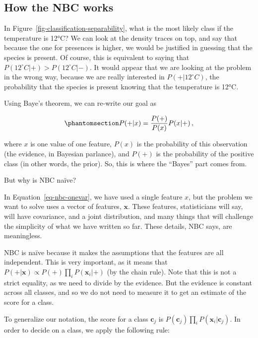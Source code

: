 \documentclass[
  letterpaper,
]{scrbook}
\begin{document}
\subsection{How the NBC works}\label{how-the-nbc-works}

In Figure~\ref{fig-classification-separability}, what is the most likely
class if the temperature is 12°C? We can look at the density traces on
top, and say that because the one for presences is higher, we would be
justified in guessing that the species is present. Of course, this is
equivalent to saying that \(P(12^\circ C | +) > P(12^\circ C | -)\). It
would appear that we are looking at the problem in the wrong way,
because we are really interested in \(P(+ | 12^\circ C)\), the
probability that the species is present knowing that the temperature is
12°C.

Using Baye's theorem, we can re-write our goal as

\begin{equation}\phantomsection\label{eq-nbc-onevar}{
P(+|x) = \frac{P(+)}{P(x)}P(x|+) \,,
}\end{equation}

where \(x\) is one value of one feature, \(P(x)\) is the probability of
this observation (the evidence, in Bayesian parlance), and \(P(+)\) is
the probability of the positive class (in other words, the prior). So,
this is where the ``Bayes'' part comes from.

But why is NBC naïve?

In Equation~\ref{eq-nbc-onevar}, we have used a single feature \(x\),
but the problem we want to solve uses a vector of features,
\(\mathbf{x}\). These features, statisticians will say, will have
covariance, and a joint distribution, and many things that will
challenge the simplicity of what we have written so far. These details,
NBC says, are meaningless.

NBC is naïve because it makes the assumptions that the features are all
independent. This is very important, as it means that
\(P(+|\mathbf{x}) \propto P(+)\prod_i P(\mathbf{x}_i|+)\) (by the chain
rule). Note that this is not a strict equality, as we need to divide by
the evidence. But the evidence is constant across all classes, and so we
do not need to measure it to get an estimate of the score for a class.

To generalize our notation, the score for a class \(\mathbf{c}_j\) is
\(P(\mathbf{c}_j)\prod_i P(\mathbf{x}_i|\mathbf{c}_j)\). In order to
decide on a class, we apply the following rule:
\end{document}
